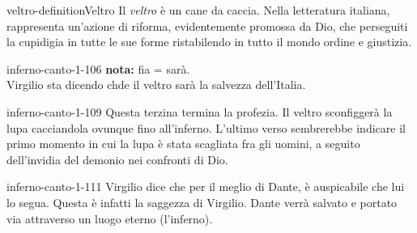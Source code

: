 \documentclass[preview]{standalone}
\begin{document}
\begin{snippetdefinition}{veltro-definition}{Veltro}
    Il \textit{veltro} è un cane da caccia.
    Nella letteratura italiana, rappresenta un'azione di riforma,
    evidentemente promossa da Dio, che perseguiti la cupidigia in tutte le sue forme
    ristabilendo in tutto il mondo ordine e giustizia. 
\end{snippetdefinition}

\begin{snippet}{inferno-canto-1-106}
    \textbf{\color{red}nota:} fia = sarà. \\
    Virgilio sta dicendo chde il veltro sarà la salvezza dell'Italia.
\end{snippet}

\begin{snippet}{inferno-canto-1-109}
    Questa terzina termina la profezia.
    Il veltro sconfiggerà la lupa cacciandola ovunque fino all'inferno.
    L'ultimo verso sembrerebbe indicare il primo momento in cui la lupa è stata scagliata
    fra gli uomini, a seguito dell'invidia del demonio nei confronti di Dio.
\end{snippet}

\begin{snippet}{inferno-canto-1-111}
    Virgilio dice che per il meglio di Dante, è auspicabile che lui lo segua.
    Questa è infatti la saggezza di Virgilio.
    Dante verrà salvato e portato via attraverso un luogo eterno (l'inferno).
\end{snippet}
\end{document}
